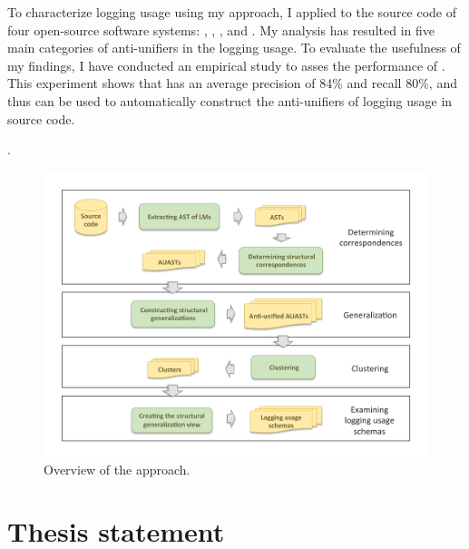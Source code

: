 To characterize logging usage using my approach, I applied  to the source code of four open-source software systems: , , , and . My analysis has resulted in five main categories of anti-unifiers in the logging usage. To evaluate the usefulness of my findings, I have conducted an empirical study to asses the performance of . This experiment shows that  has an average precision of 84\% and recall 80\%, and thus can be used to automatically construct the anti-unifiers of logging usage in source code.



. %


\begin{figure} [t]
  \centering\includegraphics [width = \textwidth]{Drawing4/SystemOverview.pdf}
  \caption{Overview of the approach. %
  }
  \label{fig:system_overview}
\end{figure}


\section{Thesis statement} \label{intro-stmt}

